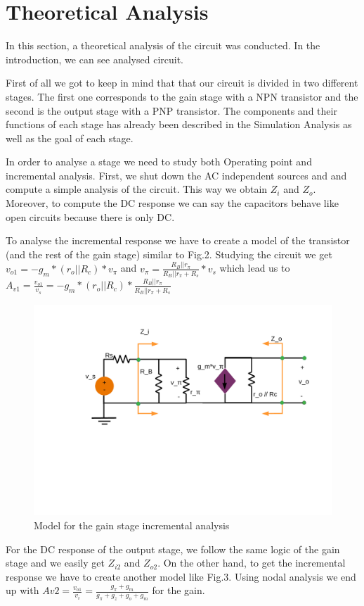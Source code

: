 \section{Theoretical Analysis} \label{section:theo}


\par In this section, a theoretical analysis of the circuit was conducted. In the introduction, we can see analysed circuit.

First of all we got to keep in mind that that our circuit is divided in two different stages. The first one corresponds to the gain stage with a NPN transistor and the second is the output stage with a PNP transistor. The components and their functions of each stage has already been described in the Simulation Analysis as well as the goal of each stage.

In order to analyse a stage we need to study both Operating point and incremental analysis.
First, we shut down the AC independent sources and  and compute a simple analysis of the circuit. This way we obtain $Z_i$ and $Z_o$. Moreover, to compute the DC response we can say the capacitors behave like open circuits because there is only DC.

To analyse the incremental response we have to create a model of the transistor (and the rest of the gain stage) similar to Fig.2. Studying the circuit we get $v_{o1}=-g_m * (r_o||R_c) * v_{\pi}$ and $v_{\pi}= \frac{R_B||r_{\pi}}{R_B||r_{\pi}+R_s} * v_s $ which lead us to $A_{v1} = \frac{v_{o1}}{v_s} = -g_m * (r_o||R_c)*\frac{R_B||r_{\pi}}{R_B||r_{\pi}+R_s}$


\begin{figure}[h] \centering
\includegraphics[width=0.65\linewidth]{Incremental_Gain.pdf}
\caption{Model for the gain stage incremental analysis}
\label{sdf}
\end{figure}

For the DC response of the output stage, we follow the same logic of the gain stage and we easily get $Z_{i2}$ and $Z_{o2}$. On the other hand, to get the incremental response we have to create another model like Fig.3. Using nodal analysis we end up with $A{v2} = \frac{v_{o1}}{v_i} = \frac{g_{\pi} + g_m }{g_{\pi}+g_z+g_o+g_m}$ for the gain.




